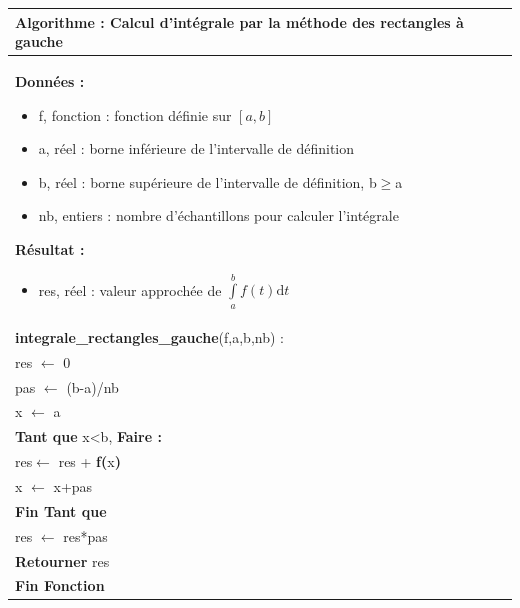 \documentclass[10pt]{article}
\begin{document}
\begin{pseudo}
\begin{center}
\begin{tabular}{p{}}
\hline
\textbf{Algorithme :} Calcul d'intégrale par la méthode des rectangles à gauche\\
\hline
\textbf{Données :}
\begin{itemize}
\item \textsf{f}, fonction : fonction définie sur $[a,b]$  
\item \textsf{a}, réel : borne inférieure de l'intervalle de définition
\item \textsf{b}, réel : borne supérieure de l'intervalle de définition, \textsf{b$\geq$a}
\item \textsf{nb}, entiers : nombre d'échantillons pour calculer l'intégrale
\end{itemize}
\textbf{Résultat :} 
\begin{itemize}
\item \textsf{res}, réel : valeur approchée de $\int\limits_a^b f(t)\text{d}t$
\end{itemize}
\\
\textbf{integrale\_rectangles\_gauche}(\textsf{f,a,b,nb}) :\\
\hspace{.4cm}\textsf{res} $\leftarrow$ \textsf{0}\\
\hspace{.4cm}\textsf{pas} $\leftarrow$ \textsf{(b-a)/nb}\\
\hspace{.4cm}\textsf{x} $\leftarrow$ \textsf{a}\\
\hspace{.4cm}\textbf{Tant que} \textsf{x<b},  \textbf{Faire :}\\
\hspace{.8cm}\textsf{res}$\leftarrow$ \textsf{res + } \textbf{f(}\textsf{x}\textbf{)}\\
\hspace{.8cm}\textsf{x} $\leftarrow$ \textsf{x+pas}\\
\hspace{.4cm}\textbf{Fin Tant que} \\
\hspace{.4cm} \textsf{res} $\leftarrow$ \textsf{res*pas}\\
\hspace{.4cm}\textbf{Retourner} \textsf{res}\\
\textbf{Fin Fonction} \\
\hline
\end{tabular}
\end{center}
\end{pseudo}
\end{document}
